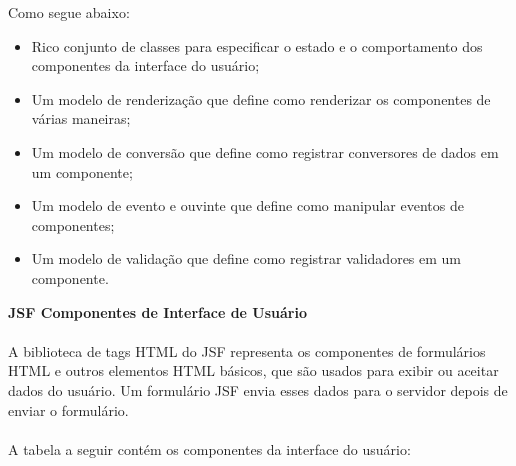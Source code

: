 \documentclass[	DIV=calc,%
							paper=a4,%
							fontsize=12pt,%
							onecolumn]{scrartcl}	 					%
\begin{document}
Como segue abaixo:
\begin{itemize}
\item Rico conjunto de classes para especificar o estado e o comportamento dos componentes da interface do usuário;
\item Um modelo de renderização que define como renderizar os componentes de várias maneiras;
\item Um modelo de conversão que define como registrar conversores de dados em um componente;
\item Um modelo de evento e ouvinte que define como manipular eventos de componentes;
\item Um modelo de validação que define como registrar validadores em um componente.
\end{itemize}
\textbf{JSF Componentes de Interface de Usuário}
\\~\\
A biblioteca de tags HTML do JSF representa os componentes de formulários HTML e outros elementos HTML básicos, que são usados para exibir ou aceitar dados do usuário. Um formulário JSF envia esses dados para o servidor depois de enviar o formulário.
\\~\\
A tabela a seguir contém os componentes da interface do usuário:
\end{document}
